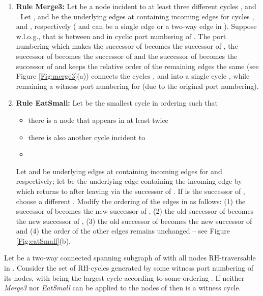 \documentclass[11pt,envcountsame,oribibl]{llncs}
\begin{document}
\begin{enumerate}


\item
{\bf Rule Merge3:} Let  be a node incident to
at least three different cycles ,  and . Let ,
 and  be the underlying edges at  containing incoming edges
for cycles ,  and , respectively ( and 
can be a single edge or a two-way edge in ). Suppose w.l.o.g.,
that  is between  and  in cyclic port numbering of . The port numbering
which makes the successor of  becomes the successor of
, the successor of  becomes the successor of  and the
successor of  becomes the successor of  and keeps the relative
order of the remaining edges the same (see Figure \ref{Fig:merge3}(a))
connects the cycles ,  and  into a single cycle , while
remaining a witness port numbering for  (due to the original port numbering).

\item
{\bf Rule EatSmall:} Let  be the smallest cycle in ordering  such that
\begin{itemize}
\item there is a node  that appears in  at least twice
\item there is also another cycle  incident to 
\item 
\end{itemize}
Let  and  be underlying edges at 
containing incoming edges for  and  respectively;
let  be the underlying edge containing the incoming edge by which
 returns to  after leaving via the successor of . If 
is the successor of , choose a different . Modify the ordering of
the edges in  as follows: (1) the successor of  becomes the
new successor of , (2) the old successor of  becomes the new
successor of , (3) the old successor of  becomes the new
successor of  and (4) the order of the other edges remains
unchanged -- see Figure \ref{Fig:eatSmall}(b).


\end{enumerate}




\begin{lemma}\label{lm:main}
Let  be a two-way connected spanning subgraph of  
with all nodes RH-traversable in  . Consider the set
of RH-cycles generated by some witness port numbering of its nodes,
with  being the largest cycle according to some ordering .
If neither {\em Merge3} nor {\em EatSmall} can be applied to
the nodes of  then  is a witness cycle.
\end{lemma}
\end{document}
